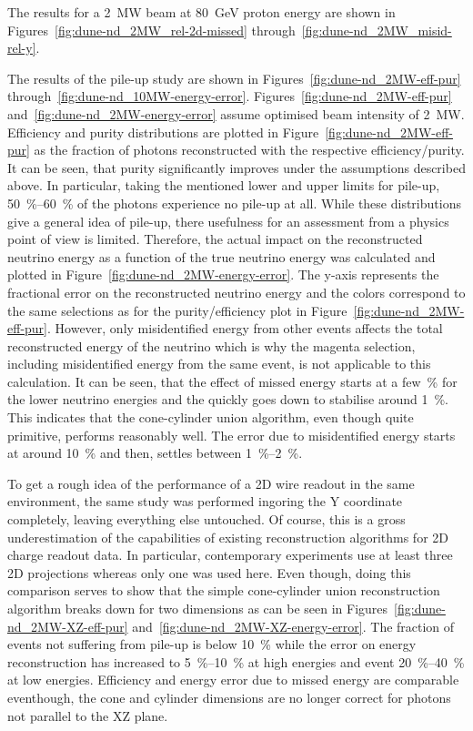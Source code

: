 The results for a \SI{2}{\mega\watt} beam at \SI{80}{\giga\electronvolt} proton energy are shown in Figures~\ref{fig:dune-nd_2MW_rel-2d-missed} through~\ref{fig:dune-nd_2MW_misid-rel-y}.


The results of the pile-up study are shown in Figures~\ref{fig:dune-nd_2MW-eff-pur} through~\ref{fig:dune-nd_10MW-energy-error}.
Figures~\ref{fig:dune-nd_2MW-eff-pur} and~\ref{fig:dune-nd_2MW-energy-error} assume optimised beam intensity of \SI{2}{\mega\watt}.
Efficiency and purity distributions are plotted in Figure~\ref{fig:dune-nd_2MW-eff-pur} as the fraction of \Pgpz photons reconstructed with the respective efficiency/purity.
It can be seen, that purity significantly improves under the assumptions described above.
In particular, taking the mentioned lower and upper limits for pile-up, \SIrange{50}{60}{\percent} of the photons experience no pile-up at all.
While these distributions give a general idea of pile-up, there usefulness for an assessment from a physics point of view is limited.
Therefore, the actual impact on the reconstructed neutrino energy as a function of the true neutrino energy was calculated and plotted in Figure~\ref{fig:dune-nd_2MW-energy-error}.
The y-axis represents the fractional error on the reconstructed neutrino energy and the colors correspond to the same selections as for the purity/efficiency plot in Figure~\ref{fig:dune-nd_2MW-eff-pur}.
However, only misidentified energy from other events affects the total reconstructed energy of the neutrino which is why the magenta selection, including misidentified energy from the same event, is not applicable to this calculation.
It can be seen, that the effect of missed energy starts at a few~\si{\percent} for the lower neutrino energies and the quickly goes down to stabilise around \SI{1}{\percent}.
This indicates that the cone-cylinder union algorithm, even though quite primitive, performs reasonably well.
The error due to misidentified energy starts at around \SI{10}{\percent} and then, settles between \SIrange{1}{2}{\percent}.

To get a rough idea of the performance of a 2D wire readout in the same environment, the same study was performed ingoring the Y coordinate completely, leaving everything else untouched.
Of course, this is a gross underestimation of the capabilities of existing reconstruction algorithms for 2D charge readout data.
In particular, contemporary experiments use at least three 2D projections whereas only one was used here.
Even though, doing this comparison serves to show that the simple cone-cylinder union reconstruction algorithm breaks down for two dimensions as can be seen in Figures~\ref{fig:dune-nd_2MW-XZ-eff-pur} and~\ref{fig:dune-nd_2MW-XZ-energy-error}.
The fraction of events not suffering from pile-up is below \SI{10}{\percent} while the error on energy reconstruction has increased to \SIrange{5}{10}{\percent} at high energies and event \SIrange{20}{40}{\percent} at low energies.
Efficiency and energy error due to missed energy are comparable eventhough, the cone and cylinder dimensions are no longer correct for photons not parallel to the XZ plane.

